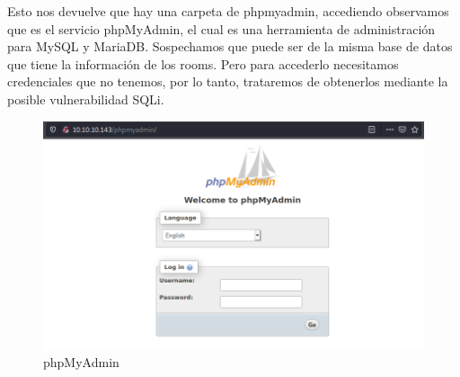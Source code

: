 \documentclass{article}
\begin{document}
Esto nos devuelve que hay una carpeta de phpmyadmin, accediendo observamos que es el servicio phpMyAdmin, el cual es una herramienta de administración para MySQL y MariaDB. Sospechamos que puede ser de la misma base de datos que tiene la información de los rooms. Pero para accederlo necesitamos credenciales que no tenemos, por lo tanto, trataremos de obtenerlos mediante la posible vulnerabilidad SQLi.
\begin{figure}[H]
	\center
	\includegraphics[width=\textwidth]{images/jarvis/5.png}
	\caption{phpMyAdmin}
\end{figure}
\end{document}
